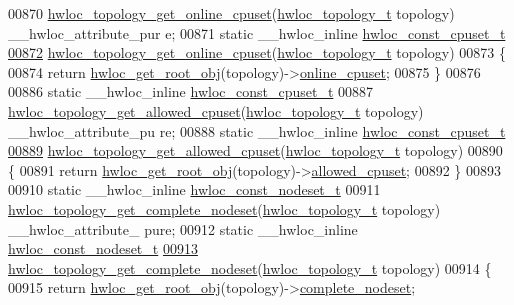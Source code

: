 \begin{DoxyCode}
{{00870 \hyperlink{a00060_gafeb07985e2cc66aee1da447aff0bcab8}{hwloc_topology_get_online_cpuset}(\hyperlink{a00039_ga9d1e76ee15a7dee158b786c30b6a6e38}{hwloc_topology_t} topology) \_\_hwloc\_attribute\_pur
      e;
00871 \textcolor{keyword}{static} \_\_hwloc\_inline \hyperlink{a00040_ga1f784433e9b606261f62d1134f6a3b25}{hwloc_const_cpuset_t}
\hypertarget{a00031_source_l00872}{}\hyperlink{a00060_gafeb07985e2cc66aee1da447aff0bcab8}{00872} \hyperlink{a00060_gafeb07985e2cc66aee1da447aff0bcab8}{hwloc_topology_get_online_cpuset}(\hyperlink{a00039_ga9d1e76ee15a7dee158b786c30b6a6e38}{hwloc_topology_t} topology)
00873 \{
00874   \textcolor{keywordflow}{return} \hyperlink{a00053_gadbf58f6e187efbdb3cd9a8e30311b7d7}{hwloc_get_root_obj}(topology)->\hyperlink{a00016_a8842d56c2975380f327ea401c5f53564}{online_cpuset};
00875 \}
00876 
00886 \textcolor{keyword}{static} \_\_hwloc\_inline \hyperlink{a00040_ga1f784433e9b606261f62d1134f6a3b25}{hwloc_const_cpuset_t}
00887 \hyperlink{a00060_ga08e3b14e1fe7642b383633d34c1f3c4a}{hwloc_topology_get_allowed_cpuset}(\hyperlink{a00039_ga9d1e76ee15a7dee158b786c30b6a6e38}{hwloc_topology_t} topology) \_\_hwloc\_attribute\_pu
      re;
00888 \textcolor{keyword}{static} \_\_hwloc\_inline \hyperlink{a00040_ga1f784433e9b606261f62d1134f6a3b25}{hwloc_const_cpuset_t}
\hypertarget{a00031_source_l00889}{}\hyperlink{a00060_ga08e3b14e1fe7642b383633d34c1f3c4a}{00889} \hyperlink{a00060_ga08e3b14e1fe7642b383633d34c1f3c4a}{hwloc_topology_get_allowed_cpuset}(\hyperlink{a00039_ga9d1e76ee15a7dee158b786c30b6a6e38}{hwloc_topology_t} topology)
00890 \{
00891   \textcolor{keywordflow}{return} \hyperlink{a00053_gadbf58f6e187efbdb3cd9a8e30311b7d7}{hwloc_get_root_obj}(topology)->\hyperlink{a00016_afa3c59a6dd3da8ffa48710780a1bfb34}{allowed_cpuset};
00892 \}
00893 
00910 \textcolor{keyword}{static} \_\_hwloc\_inline \hyperlink{a00040_ga2f5276235841ad66a79bedad16a5a10c}{hwloc_const_nodeset_t}
00911 \hyperlink{a00061_gaddb7a1f3d71510bb011189e0b8edf29f}{hwloc_topology_get_complete_nodeset}(\hyperlink{a00039_ga9d1e76ee15a7dee158b786c30b6a6e38}{hwloc_topology_t} topology) \_\_hwloc\_attribute\_
      pure;
00912 \textcolor{keyword}{static} \_\_hwloc\_inline \hyperlink{a00040_ga2f5276235841ad66a79bedad16a5a10c}{hwloc_const_nodeset_t}
\hypertarget{a00031_source_l00913}{}\hyperlink{a00061_gaddb7a1f3d71510bb011189e0b8edf29f}{00913} \hyperlink{a00061_gaddb7a1f3d71510bb011189e0b8edf29f}{hwloc_topology_get_complete_nodeset}(\hyperlink{a00039_ga9d1e76ee15a7dee158b786c30b6a6e38}{hwloc_topology_t} topology)
00914 \{
00915   \textcolor{keywordflow}{return} \hyperlink{a00053_gadbf58f6e187efbdb3cd9a8e30311b7d7}{hwloc_get_root_obj}(topology)->\hyperlink{a00016_ac38c4012127525ef74c5615c526f4c2e}{complete_nodeset};
}}
\end{DoxyCode}
